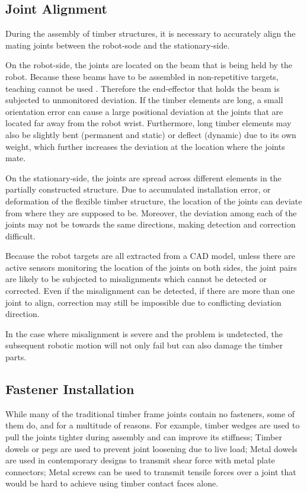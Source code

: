 \subsection{Joint Alignment}
\label{subsection:challenges_joint_alignment}

During the assembly of timber structures, it is necessary to accurately align the mating joints between the robot-sode and the stationary-side.

On the robot-side, the joints are located on the beam that is being held by the robot. Because these beams have to be assembled in non-repetitive targets, teaching cannot be used . Therefore the end-effector that holds the beam is subjected to unmonitored deviation. If the timber elements are long, a small orientation error can cause a large positional deviation at the joints that are located far away from the robot wrist. Furthermore, long timber elements may also be slightly bent (permanent and static) or deflect (dynamic) due to its own weight, which further increases the deviation at the location where the joints mate.

On the stationary-side, the joints are spread across different elements in the partially constructed structure. Due to accumulated installation error, or deformation of the flexible timber structure, the location of the joints can deviate from where they are supposed to be. Moreover, the deviation among each of the joints may not be towards the same directions, making detection and correction difficult.

Because the robot targets are all extracted from a CAD model, unless there are active sensors monitoring the location of the joints on both sides, the joint pairs are likely to be subjected to misalignments which cannot be detected or corrected. Even if the misalignment can be detected, if there are more than one joint to align, correction may still be impossible due to conflicting deviation direction.

In the case where misalignment is severe and the problem is undetected, the subsequent robotic motion will not only fail but can also damage the timber parts. 

\subsection{Fastener Installation}
\label{subsection:challenges_fastener_installation}

While many of the traditional timber frame joints contain no fasteners, some of them do, and for a multitude of reasons. For example, timber wedges are used to pull the joints tighter during assembly and can improve its stiffness; Timber dowels or pegs are used to prevent joint loosening due to live load; Metal dowels are used in contemporary designs to transmit shear force with metal plate connectors; Metal screws can be used to transmit tensile forces over a joint that would be hard to achieve using timber contact faces alone. 

